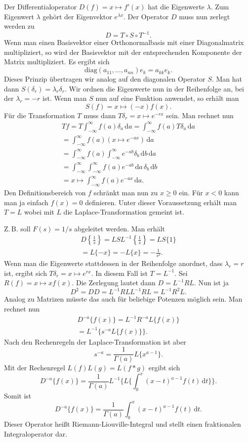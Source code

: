 \documentclass[a4paper,10pt,fleqn,twocolumn,twoside]{article}
\begin{document}
Der Differentialoperator $D(f)=x\mapsto f'(x)$ hat die
Eigenwerte $\lambda$. Zum Eigenwert $\lambda$ gehört der
Eigenvektor $e^{\lambda x}$. Der Operator $D$ muss nun zerlegt
werden zu
\[D=T\circ S\circ T^{-1}.\]
Wenn man einen Basisvektor einer Orthonormalbasis mit einer
Diagonalmatrix multipliziert, so wird der Basisvektor mit der
entsprechenden Komponente der Matrix multipliziert. Es ergibt sich
\[\mathrm{diag}(a_{11},\ldots,a_{nn})e_k = a_{kk}e_k.\]
Dieses Prinzip übertragen wir analog auf den diagonalen
Operator $S$. Man hat dann $S(\delta_r) = \lambda_r \delta_r$.
Wir ordnen die Eigenwerte nun in der Reihenfolge an, bei der
$\lambda_r=-r$ ist. Wenn man $S$ nun auf eine Funktion anwendet,
so erhält man
\[S(f) = x\mapsto (-x)f(x).\]
Für die Transformation $T$ muss dann
$T\delta_r = x\mapsto e^{-rx}$ sein.
Man rechnet nun
\begin{gather*}
Tf = T\int_{-\infty}^{\infty} f(a)\delta_a\,\mathrm da
= \int_{-\infty}^{\infty} f(a)T\delta_a\,\mathrm da\\
= \int_{-\infty}^{\infty} f(a)(x\mapsto e^{-ax})\,\mathrm da\\
= \int_{-\infty}^{\infty} f(a)\int_{-\infty}^{\infty} e^{-ab}\delta_b
\,\mathrm db\,\mathrm da\\
= \int_{-\infty}^{\infty}\int_{-\infty}^{\infty} f(a)e^{-ab}
\,\mathrm da\,\delta_b\,\mathrm db\\
= x\mapsto \int_{-\infty}^{\infty} f(a)e^{-ax}\,\mathrm da.
\end{gather*}
Den Definitionsbereich von $f$ schränkt man nun zu $x\ge 0$ ein.
Für $x<0$ kann man ja einfach $f(x)=0$ definieren. Unter dieser
Voraussetzung erhält man $T=L$ wobei mit $L$ die
Laplace-Transformation gemeint ist.

Z.\,B. soll $F(s)=1/s$ abgeleitet werden. Man erhält
\begin{gather*}
D\left\{\frac{1}{s}\right\}
= LSL^{-1}\left\{\frac{1}{s}\right\} = LS\{1\}\\
= L\{-x\} = -L\{x\} = -\frac{1}{s^2}.
\end{gather*}
Wenn man die Eigenwerte stattdessen in der Reihenfolge anordnet,
dass $\lambda_r=r$ ist, ergibt sich
$T\delta_r=x\mapsto e^{rx}$. In diesem Fall ist $T=L^{-1}$.
Sei $R(f)=x\mapsto xf(x)$. Die Zerlegung lautet dann
$D=L^{-1}RL$. Nun ist ja
\[D^2 = DD = L^{-1}RLL^{-1}RL = L^{-1}R^2L.\]
Analog zu Matrizen müsste das auch für beliebige Potenzen möglich
sein. Man rechnet nun
\begin{gather*}
D^{-a}\{f(x)\} = L^{-1}R^{-a}L\{f(x)\}\\
= L^{-1}\{s^{-a}L\{f(x)\}\}.
\end{gather*}
Nach den Rechenregeln der Laplace-Transformation ist aber
\[s^{-a} = \frac{1}{\Gamma(a)}L\{x^{a-1}\}.\]
Mit der Rechenregel $L(f)L(g) = L(f*g)$ ergibt sich
\[D^{-a}\{f(x)\}
= \frac{1}{\Gamma(a)}L^{-1}
\{L\{\int_0^x (x-t)^{a-1}f(t)\,\mathrm dt\}\}.\]
Somit ist
\[D^{-a}\{f(x)\}
= \frac{1}{\Gamma(a)}
\int_0^x (x-t)^{a-1}f(t)\,\mathrm dt.\]
Dieser Operator heißt Riemann-Liouville-Integral und stellt
einen fraktionalen Integraloperator dar.
\end{document}
